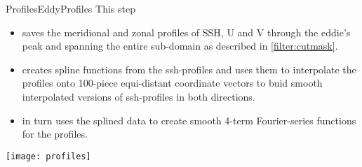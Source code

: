 \begin{filter}{Profiles}{EddyProfiles}
\label{filter:profiles}
This step
\begin{itemize}
\item
 saves the meridional and zonal profiles of SSH, U and V through  the eddie's peak and spanning the entire sub-domain as described in \ref{filter:cutmask}.
\item
creates spline functions from the ssh-profiles and uses them to interpolate the profiles onto 100-piece equi-distant coordinate vectors to buid smooth interpolated versions of ssh-profiles in both directions.
\item
in turn uses the splined data to create smooth 4-term Fourier-series functions for the profiles.
\end{itemize}
\end{filter}
\begin{marginfigure}
	\texttt{[image: profiles]}
	\caption{Zonal $x$- and $z$-normalized cyclone-profiles (early data $\sim$ '13/12).}
	\label{fig:profiles}
\end{marginfigure}
